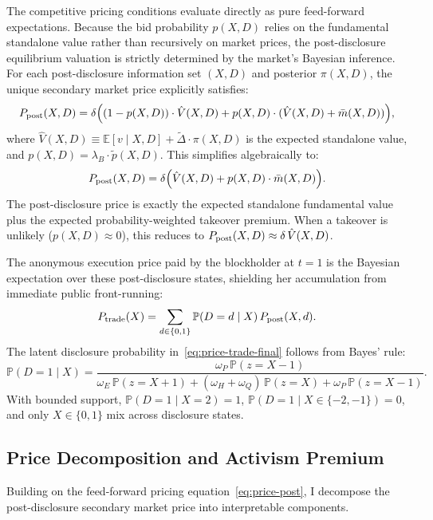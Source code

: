 \documentclass[11pt]{article}
\newcommand{\E}{\mathbb{E}}
\newcommand{\PP}{\mathbb{P}}
\newcommand{\1}{\mathbf{1}}
\begin{document}
The competitive pricing conditions evaluate directly as pure feed-forward expectations. Because the bid probability $p(X,D)$ relies on the fundamental standalone value rather than recursively on market prices, the post-disclosure equilibrium valuation is strictly determined by the market's Bayesian inference. For each post-disclosure information set $(X,D)$ and posterior $\pi(X,D)$, the unique secondary market price explicitly satisfies:
\begin{equation}
P_{\textup{post}}(X,D) = \delta\Big((1-p(X,D)) \cdot \hat{V}(X,D) + p(X,D) \cdot (\hat{V}(X,D) + \bar{m}(X,D))\Big),
\label{eq:price-fp-full}
\end{equation}
where $\hat{V}(X,D) \equiv \E[v \mid X,D] + \tilde{\Delta} \cdot \pi(X,D)$ is the expected standalone value, and $p(X,D) = \lambda_B \cdot \tilde{p}(X,D)$. This simplifies algebraically to:
\begin{equation}
P_{\textup{post}}(X,D) = \delta \Big( \hat{V}(X,D) + p(X,D) \cdot \bar{m}(X,D) \Big).
\label{eq:price-post}
\end{equation}
The post-disclosure price is exactly the expected standalone fundamental value plus the expected probability-weighted takeover premium. When a takeover is unlikely ($p(X,D)\approx 0$), this reduces to $P_{\textup{post}}(X,D)\approx \delta\,\hat{V}(X,D)$.

The anonymous execution price paid by the blockholder at $t=1$ is the Bayesian expectation over these post-disclosure states, shielding her accumulation from immediate public front-running:
\begin{equation}
P_{\textup{trade}}(X) = \sum_{d \in \{0,1\}} \PP(D=d \mid X) \, P_{\textup{post}}(X,d).
\label{eq:price-trade-final}
\end{equation}
The latent disclosure probability in~\eqref{eq:price-trade-final} follows from Bayes' rule:
\[
\PP(D=1\mid X)
=\frac{\omega_P\,\PP(z=X-1)}
{\omega_E\,\PP(z=X+1)+(\omega_H+\omega_Q)\,\PP(z=X)+\omega_P\,\PP(z=X-1)}.
\]
With bounded support, $\PP(D=1\mid X=2)=1$, $\PP(D=1\mid X\in\{-2,-1\})=0$, and only $X\in\{0,1\}$ mix across disclosure states.

%
\subsection{Price Decomposition and Activism Premium}

Building on the feed-forward pricing equation~\eqref{eq:price-post}, I decompose the post-disclosure secondary market price into interpretable components.
\end{document}
